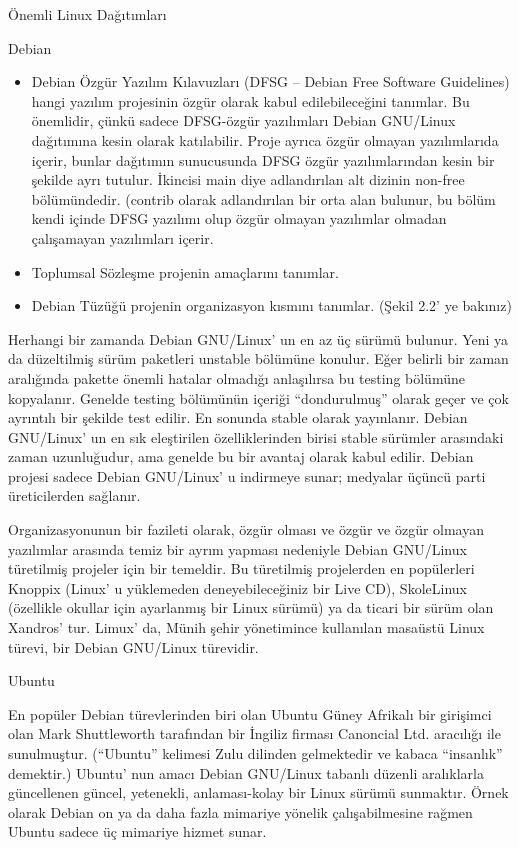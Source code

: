 \documentclass[10pt,a5paper]{book}
\begin{document}
\begin{section}{Önemli Linux Dağıtımları}
\begin{subsection}{Debian}
\begin{itemize}
 \item Debian Özgür Yazılım Kılavuzları (DFSG – Debian Free Software Guidelines) hangi yazılım projesinin özgür olarak kabul edilebileceğini tanımlar. Bu önemlidir, çünkü sadece DFSG-özgür yazılımları Debian GNU/Linux dağıtımına kesin olarak katılabilir. Proje ayrıca özgür olmayan yazılımlarıda içerir, bunlar dağıtımın sunucusunda DFSG özgür yazılımlarından kesin bir şekilde ayrı tutulur. İkincisi main diye adlandırılan alt dizinin non-free bölümündedir. (contrib olarak adlandırılan bir orta alan bulunur, bu bölüm kendi içinde DFSG yazılımı olup özgür olmayan yazılımlar olmadan çalışamayan yazılımları içerir.
 \item Toplumsal Sözleşme projenin amaçlarını tanımlar.
 \item Debian Tüzüğü projenin organizasyon kısmını tanımlar. (Şekil 2.2' ye bakınız)
\end{itemize}

Herhangi bir zamanda Debian GNU/Linux' un en az üç sürümü bulunur. Yeni ya da düzeltilmiş sürüm paketleri unstable bölümüne konulur. Eğer belirli bir zaman aralığında pakette önemli hatalar olmadığı anlaşılırsa bu testing bölümüne kopyalanır. Genelde testing bölümünün içeriği “dondurulmuş” olarak geçer ve çok ayrıntılı bir şekilde test edilir. En sonunda stable olarak yayınlanır. Debian GNU/Linux' un en sık eleştirilen özelliklerinden birisi stable sürümler arasındaki zaman uzunluğudur, ama genelde bu bir avantaj olarak kabul edilir. Debian projesi sadece Debian GNU/Linux' u indirmeye sunar; medyalar üçüncü parti üreticilerden sağlanır.

Organizasyonunun bir fazileti olarak, özgür olması ve özgür ve özgür olmayan yazılımlar arasında temiz bir ayrım yapması nedeniyle Debian GNU/Linux türetilmiş projeler için bir temeldir. Bu türetilmiş projelerden en popülerleri Knoppix (Linux' u yüklemeden deneyebileceğiniz bir Live CD), SkoleLinux (özellikle okullar için ayarlanmış bir Linux sürümü) ya da ticari bir sürüm olan Xandros' tur. Limux' da, Münih şehir yönetimince kullanılan masaüstü Linux türevi, bir Debian GNU/Linux türevidir.

\end{subsection}
\begin{subsection}{Ubuntu}

En popüler Debian türevlerinden biri olan Ubuntu Güney Afrikalı bir girişimci olan Mark Shuttleworth tarafından bir İngiliz firması Canoncial Ltd. aracılığı ile sunulmuştur. (“Ubuntu” kelimesi Zulu dilinden gelmektedir ve kabaca “insanlık” demektir.) Ubuntu' nun amacı Debian GNU/Linux tabanlı düzenli aralıklarla güncellenen güncel, yetenekli, anlaması-kolay bir Linux sürümü sunmaktır. Örnek olarak Debian on ya da daha fazla mimariye yönelik çalışabilmesine rağmen Ubuntu sadece üç mimariye hizmet sunar.


\end{subsection}
\end{section}
\end{document}
